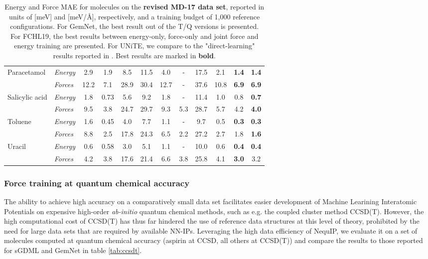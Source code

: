 \documentclass[%
reprint,
superscriptaddress,
nofootinbib,
amsmath,amssymb,
aps,
prl,
]{revtex4-1}
\begin{document}
\begin{table}[!htbp]
{\begin{tabular}{llcccccccccc}
\multirow{2}{*}{Paracetamol}  & \textit{Energy} & 2.9 &  1.9 & 8.5 & 11.5 & 4.0  & - & 17.5 & 2.1 & \textbf{1.4} & \textbf{1.4}  \\ 
                          & \textit{Forces} & 12.2 & 7.1  & 28.9 & 30.4 & 12.7 & - & 37.6 & 10.8 &\textbf{ 6.9} & \textbf{ 6.9} \\ \hline

\multirow{2}{*}{Salicylic acid}  & \textit{Energy} & 1.8 & 0.73& 5.6 & 9.2  & 1.8 &  - & 11.4 & 1.0 & 0.8  &\textbf{ 0.7 } \\ 
                          & \textit{Forces} & 9.5 & 3.8 & 24.7 & 29.7 & 9.3 & 5.3 & 28.7 & 5.7 & 4.2 & \textbf{4.0 }\\ \hline
                          
\multirow{2}{*}{Toluene}  & \textit{Energy} & 1.6 & 0.45 & 4.0 & 7.7 & 1.1 & - & 9.7 & 0.5  & \textbf{0.3}  &  \textbf{0.3} \\ 
                          & \textit{Forces} & 8.8 & 2.5 & 17.8 & 24.3 & 6.5 & 2.2 & 27.2 & 2.7 & 1.8 & \textbf{1.6} \\ \hline
                          
\multirow{2}{*}{Uracil}  & \textit{Energy} & 0.6 & 0.58 & 3.0 & 5.1 & 1.1 & - & 10.0 & 0.6&\textbf{ 0.4} &\textbf{ 0.4 } \\ 
                          & \textit{Forces} & 4.2 & 3.8 & 17.6 & 21.4 & 6.6 & 3.8 & 25.8 & 4.1 &\textbf{ 3.0} & 3.2  \\ \hline
  \hline \hline
    \end{tabular}}
    \caption{Energy and Force MAE for molecules on the \textbf{revised MD-17 data set}, reported in units of [meV] and [meV/{\AA}], respectively, and a training budget of 1,000 reference configurations. For GemNet, the best result out of the T/Q versions is presented. For FCHL19, the best results between energy-only, force-only and joint force and energy training are presented. For UNiTE, we compare to the "direct-learning" results reported in \cite{qiao2021unite}. Best results are marked in \textbf{bold}. }
    \label{tab:revmd17}
\end{table}

\subsubsection{Force training at quantum chemical accuracy}
The ability to achieve high accuracy on a comparatively small data set facilitates easier development of Machine Learining Interatomic Potentials on expensive high-order \textit{ab-initio} quantum chemical methods, such as e.g. the coupled cluster method CCSD(T). However, the high computational cost of CCSD(T) has thus far hindered the use of reference data structures at this level of theory, prohibited by the need for large data sets that are required by available NN-IPs. Leveraging the high data efficiency of NequIP, we evaluate it on a set of molecules computed at quantum chemical accuracy (aspirin at CCSD, all others at CCSD(T)) \cite{sgdml} and compare the results to those reported for sGDML \cite{sgdml} and GemNet \cite{klicpera2021gemnet} in table \ref{tab:ccsdt}.
\end{document}
